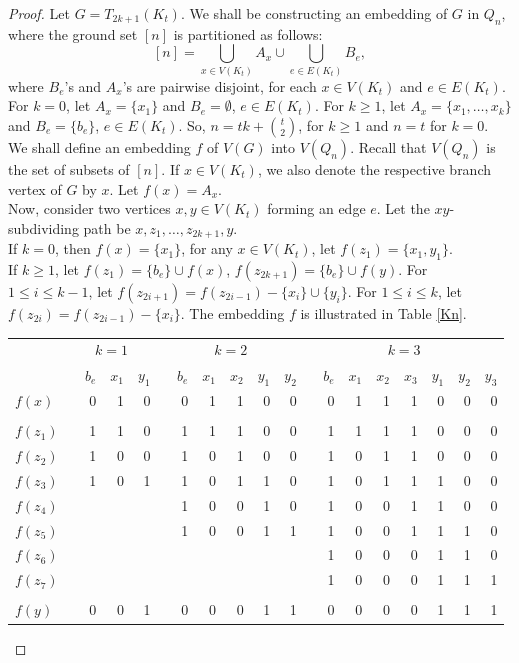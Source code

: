\documentclass[11pt, a4paper]{article}
\begin{document}
		
\begin{proof}
Let $G= T_{2k+1}(K_t)$. We shall be constructing an embedding of $G$ in $Q_n$, where the ground set $[n]$ is partitioned as follows:
 $$[n] =\bigcup_{x\in V(K_t)} A_x \cup \bigcup_{e\in E(K_t)} B_e,$$
where $B_e$'s and $A_x$'s are pairwise disjoint,  for each $x\in V(K_t)$ and $e\in E(K_t)$. 
For $k=0$, let    $A_x=\{x_1\}$ and  $B_e= \emptyset$, $e\in E(K_t)$.   For $k\geq 1$, let   $A_x=\{x_1, \ldots, x_k\}$  and  $B_e=\{b_e\}$, $e\in E(K_t)$.  So,  $n= tk+\binom{t}{2}$, for $k\geq 1$ and $n=t$ for $k=0$. \\

We shall define an embedding $f$ of $V(G)$ into $V(Q_n)$. 
Recall that  $V(Q_n)$ is the set of subsets of $[n]$.  If $x\in V(K_t)$, we also denote the respective branch vertex of $G$ by $x$.  Let $f(x) = A_x$. \\
 
 Now, consider two vertices $x, y\in V(K_t)$ forming an edge $e$. 
 Let the $xy$-subdividing path be $x, z_1, \ldots, z_{2k+1}, y$. \\
 
 If $k=0$, then $f(x) =\{x_1\}$, for any $x\in V(K_t)$,  let $f(z_1) = \{x_1, y_1\}$. \\
 
 
 If $k\geq 1$,  let $f(z_1) = \{b_e\} \cup f(x)$, $f(z_{2k+1})=  \{b_e\} \cup f(y)$. 
 For $1\leq i \leq k-1$, let   $f(z_{2i+1}) =  f(z_{2i-1}) - \{x_i\}\cup \{y_i\}$. 
 For $1\leq i\leq k$,  let  $f(z_{2i}) = f(z_{2i-1})- \{x_i\}$. The embedding $f$ is illustrated in Table \ref{Kn}.\\
 
\begin{table}[h]
\centering
\begin{tabular} {l||r|r|r||r|rr|rr||r|rrr|rrr} 
& \multicolumn{3}{c||}{$k=1$} & \multicolumn{5}{c||}{$k=2$} & \multicolumn{7}{c}{$k=3$}\\
&$~~~~b_e$& $x_1$& $y_1$	 							&$~~~~b_e$& $x_1$& $x_2$& $y_1$& $y_2$				&$~~~~b_e$& $x_1$& $x_2$& $x_3$& $y_1$&$y_2$&$y_3$\\
\hline \hline
$f(x)$& 	0&1&0												&0&1&1&0&0										&0&1&1&1&0&0&0\\
&&&&&&&&&&&&&&&\\
$f(z_1)$& 1&1&0												&1&1&1&0&0										&1&1&1&1&0&0 &0\\
$f(z_2)$& 1&0&0												&1&0&1&0&0										&1&0&1&1&0&0&0\\
$f(z_3)$& 1&0&1												&1&0&1&1&0										&1&0&1&1&1&0&0\\
$f(z_4)$& &&													&1&0&0&1&0										&1&0&0&1&1&0&0\\
$f(z_5)$& &&													&1&0&0&1&1										&1&0&0&1&1&1&0\\
$f(z_6)$& &&													&&&&&											&1&0&0&0&1&1&0\\
$f(z_7)$& &&													&&&&&											&1&0&0&0&1&1&1\\
&&&&&&&&&&&&&&&\\
$f(y)$& 	0&0&1												&0&0&0&1&1										&0&0&0&0&1&1&1
\end{tabular} 


\end{table}
\end{proof}
\end{document}
